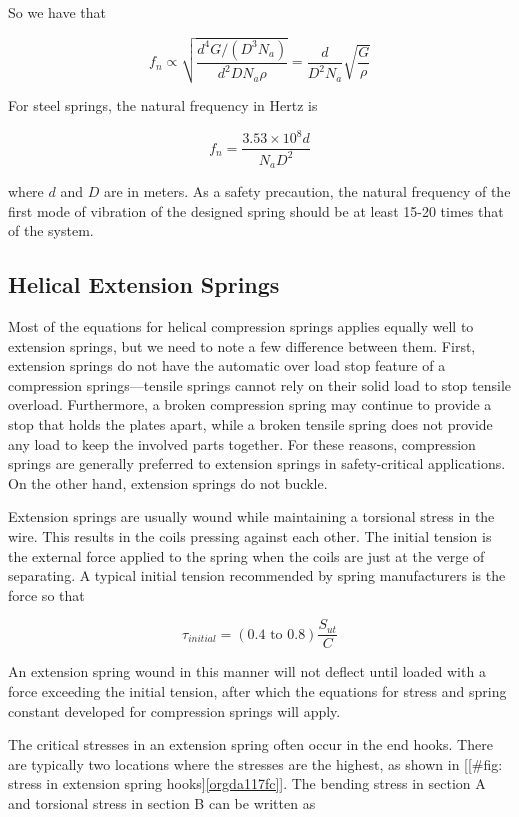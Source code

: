 \documentclass[a4paper,openany,12pt]{book}
\begin{document}
{{So we have that

$$f_n \propto \sqrt {\frac{d^4G/(D^3N_a)}{d^2DN_a\rho }}  = \frac{d}{D^2N_a}\sqrt {\frac{G}{\rho }}$$

For steel springs, the natural frequency in Hertz is

$$f_n = \frac{3.53 \times 10^8d}{N_aD^2}$$

where \(d\) and \(D\) are in meters. As a safety precaution, the natural
frequency of the first mode of vibration of the designed spring should
be at least 15-20 times that of the system.

\subsection{Helical Extension Springs}
\label{sec:orgcb7a284}
Most of the equations for helical compression springs applies equally
well to extension springs, but we need to note a few difference between
them. First, extension springs do not have the automatic over load stop
feature of a compression springs---tensile springs cannot rely on their
solid load to stop tensile overload. Furthermore, a broken compression
spring may continue to provide a stop that holds the plates apart, while
a broken tensile spring does not provide any load to keep the involved
parts together. For these reasons, compression springs are generally
preferred to extension springs in safety-critical applications. On the
other hand, extension springs do not buckle.

Extension springs are usually wound while maintaining a torsional stress
in the wire. This results in the coils pressing against each other. The
initial tension is the external force applied to the spring when the
coils are just at the verge of separating. A typical initial tension
recommended by spring manufacturers is the force so that

$$\tau_{initial} = (0.4 \text{ to } 0.8)\frac{S_{ut}}{C}$$

An extension spring wound in this manner will not deflect until loaded
with a force exceeding the initial tension, after which the equations
for stress and spring constant developed for compression springs will
apply.

The critical stresses in an extension spring often occur in the end
hooks. There are typically two locations where the stresses are the
highest, as shown in
[[\#fig: stress in extension spring hooks]\ref{orgda117fc}].
The bending stress in section A and torsional stress in section B can be
written as

}}
\end{document}
